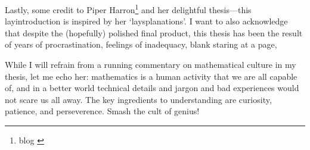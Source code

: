 Lastly, some credit to Piper Harron\footnote{blog \cite{Har15}} and her delightful
thesis---this layintroduction is inspired by her `laysplanations'. I want to also acknowledge that
despite the (hopefully) polished final product, this thesis has been the result
of years of procrastination, feelings of inadequacy, blank staring at a page, 

While I will refrain from a running commentary on mathematical culture in my
thesis, let me echo her: mathematics is a human activity that we are all capable
of, and in a better world technical details and jargon and bad experiences would
not scare us all away. The key ingredients to understanding are curiosity,
patience, and perseverence. Smash the cult of genius! 

